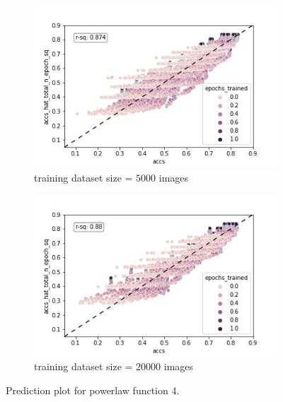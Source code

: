 \documentclass{article} %
\begin{document}
\begin{figure}
    \begin{subfigure}{.5\textwidth}
      \centering
      \includegraphics[width=.8\linewidth]{powerlaw_train_accs_hat_total_n_epoch_sq}
      \caption{training dataset size = $5000$ images}
      \label{fig:powerlaw_accs_hat_total_n_epoch_sq_train}
    \end{subfigure}%
    \begin{subfigure}{.5\textwidth}
      \centering
      \includegraphics[width=.8\linewidth]{powerlaw_val_accs_hat_total_n_epoch_sq}
      \caption{training dataset size = $20000$ images}
      \label{fig:powerlaw_accs_hat_total_n_epoch_sq_val}
    \end{subfigure}
    \caption{Prediction plot for powerlaw function 4.}
    \label{fig:powerlaw_accs_hat_total_n_epoch_sq}
\end{figure}
\end{document}
